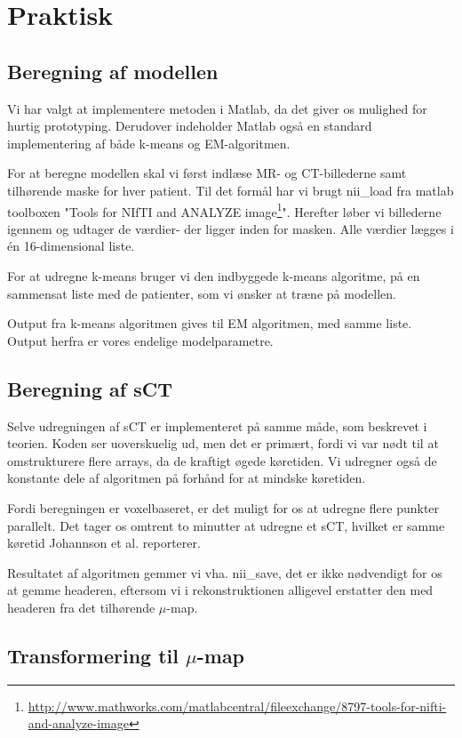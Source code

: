 \section{Praktisk}

\subsection{Beregning af modellen}

Vi har valgt at implementere metoden i Matlab, da det giver os mulighed
for hurtig prototyping. Derudover indeholder Matlab også en standard
implementering af både k-means og EM-algoritmen.

For at beregne modellen skal vi først indlæse MR- og CT-billederne
samt tilhørende maske for hver patient. Til det formål har vi brugt
nii\_load fra matlab toolboxen "Tools for NIfTI and ANALYZE
image\footnote{\url{http://www.mathworks.com/matlabcentral/fileexchange/8797-tools-for-nifti-and-analyze-image}}".
Herefter løber vi billederne igennem og udtager de værdier- der ligger
inden for masken. Alle værdier lægges i én 16-dimensional liste.

For at udregne k-means bruger vi den indbyggede k-means algoritme, på
en sammensat liste med de patienter, som vi ønsker at træne på
modellen.

Output fra k-means algoritmen gives til EM algoritmen, med samme liste. Output herfra er vores endelige modelparametre.

\subsection{Beregning af sCT}

Selve udregningen af sCT er implementeret på samme måde, som beskrevet i
teorien. Koden ser uoverskuelig ud, men det er primært, fordi
vi var nødt til at omstrukturere flere arrays, da de kraftigt øgede køretiden. Vi udregner også de konstante dele
af algoritmen på forhånd for at mindske køretiden.

Fordi beregningen er voxelbaseret, er det muligt for os at udregne flere
punkter parallelt. Det tager os omtrent to minutter at udregne et sCT,
hvilket er samme køretid Johannson et al. reporterer.

Resultatet af algoritmen gemmer vi vha. nii\_save, det er ikke
nødvendigt for os at gemme headeren, eftersom vi i rekonstruktionen
alligevel erstatter den med headeren fra det tilhørende $\mu$-map.

\subsection{Transformering til \texorpdfstring{$\mu$}{u}-map} 

